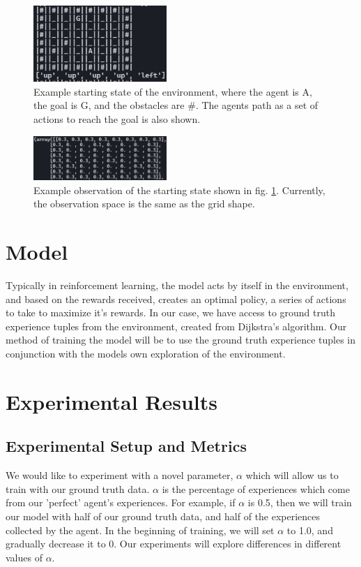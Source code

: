 \documentclass[sigplan,screen]{acmart}
\begin{document}
\begin{figure}
    \centering
    \includegraphics[width=0.45\textwidth]{assets/dataset/step0.png}
    \caption{Example starting state of the environment, where the agent is A,
        the goal is G, and the obstacles are $\#$. The agents path as a set of
        actions to reach the goal is also shown.}
    \label{fig:env_step0}
\end{figure}

\begin{figure}
    \centering
    \includegraphics[width=0.45\textwidth]{assets/dataset/observation.png}
    \caption{Example observation of the starting state shown in fig.
        \ref{fig:env_step0}. Currently, the observation space is the same as the
        grid shape.}
    \label{fig:env_observation}
\end{figure}

\section{Model}
Typically in reinforcement learning, the model acts by itself in the
environment, and based on the rewards received, creates an optimal policy, a
series of actions to take to maximize it's rewards. In our case, we have access
to ground truth experience tuples from the environment, created from Dijkstra's
algorithm. Our method of training the model will be to use the ground truth
experience tuples in conjunction with the models own exploration of the
environment.

\section{Experimental Results}

\subsection{Experimental Setup and Metrics}
We would like to experiment with a novel parameter, $\alpha$ which will allow us
to train with our ground truth data. $\alpha$ is the percentage of experiences
which come from our 'perfect' agent's experiences. For example, if $\alpha$ is
0.5, then we will train our model with half of our ground truth data, and half
of the experiences collected by the agent. In the beginning of training, we will
set $\alpha$ to 1.0, and gradually decrease it to 0. Our experiments will
explore differences in different values of $\alpha$.
\end{document}
